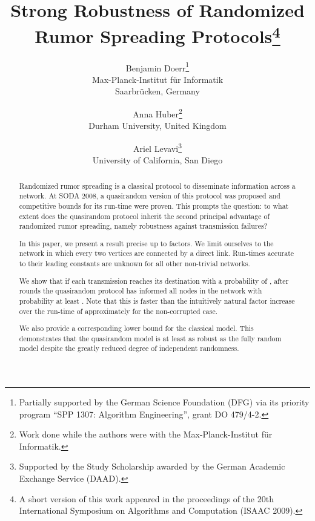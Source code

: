 \documentclass[12pt]{article}
\begin{document}
\title{Strong Robustness of Randomized\\ Rumor Spreading Protocols\thanks{A short version of this work appeared in the proceedings of the 20th International Symposium on Algorithms and Computation (ISAAC 2009).}}

\author{Benjamin Doerr\thanks{Partially supported by the German Science
Foundation (DFG) via its priority program ``SPP 1307: Algorithm Engineering'', grant DO 479/4-2.}\\
Max-Planck-Institut f\"ur Informatik\\
Saarbr\"ucken, Germany\\
\and Anna Huber\thanks{Work done while the authors were with the Max-Planck-Institut f\"ur Informatik.}\\
Durham University, United Kingdom\\
\and Ariel Levavi\samethanks\hspace{6pt}\thanks{Supported by the Study Scholarship awarded by the German Academic Exchange Service (DAAD).}\\
University of California, San Diego\\
}
\date{}

\maketitle

\begin{abstract}
  Randomized rumor spreading is a classical protocol to disseminate information across a network. At SODA 2008, a quasirandom version of this protocol was proposed and competitive bounds for its run-time were proven. This prompts the question: to what extent does the quasirandom protocol inherit the second principal advantage of randomized rumor spreading, namely robustness against transmission failures? 
  
In this paper, we present a result precise up to  factors. We limit ourselves to the network in which every two vertices are connected by a direct link.  Run-times accurate to their leading constants are unknown for all other non-trivial networks. 
  
  We show that if each transmission reaches its destination with a probability of , after  rounds the quasirandom protocol has informed all  nodes in the network with probability at least . Note that this is faster than the intuitively natural  factor increase over the run-time of approximately  for the non-corrupted case. 
  
  We also provide a corresponding lower bound for the classical model. This demonstrates that the quasirandom model is at least as robust as the fully random model despite the greatly reduced degree of independent randomness. 
\end{abstract}
\end{document}
